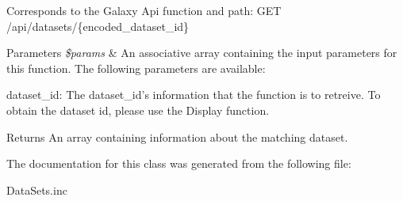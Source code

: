 Corresponds to the Galaxy Api function and path\-: G\-E\-T /api/datasets/\{encoded\-\_\-dataset\-\_\-id\}


\begin{DoxyParams}{Parameters}
{\em \$params} & An associative array containing the input parameters for this function. The following parameters are available\-:\\
\hline
\end{DoxyParams}

\begin{DoxyItemize}
\item dataset\-\_\-id\-: The dataset\-\_\-id's information that the function is to retreive. To obtain the dataset id, please use the Display function.
\end{DoxyItemize}

\begin{DoxyReturn}{Returns}
An array containing information about the matching dataset. 
\end{DoxyReturn}


The documentation for this class was generated from the following file\-:\begin{DoxyCompactItemize}
\item 
Data\-Sets.\-inc\end{DoxyCompactItemize}
